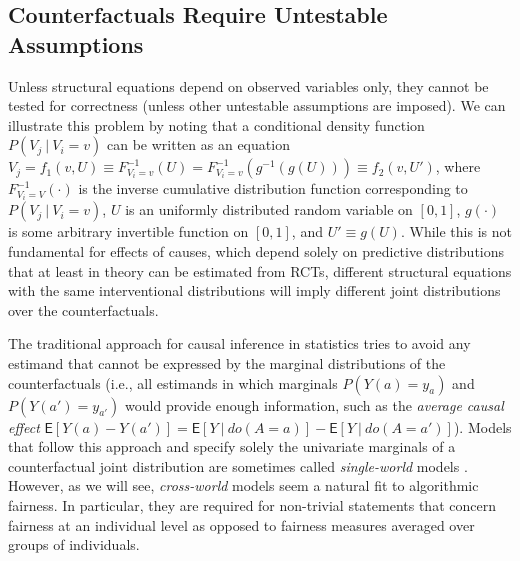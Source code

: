 \documentclass{article}
\begin{document}
\subsection{Counterfactuals Require Untestable Assumptions}
\label{sec:untestable}
Unless structural equations depend on observed variables only, they
cannot be tested for correctness (unless other untestable assumptions
are imposed). We can illustrate this problem by noting that a
conditional density function $P(V_j\ |\ V_i = v)$ can be written as an
equation $V_j = f_1(v, U) \equiv F^{-1}_{V_i = v}(U) = F^{-1}_{V_i = v}(g^{-1}(g(U))) \equiv f_2(v, U')$,
where $F^{-1}_{V_i = V}(\cdot)$ is the inverse cumulative distribution
function corresponding to $P(V_j\ |\ V_i = v)$, $U$ is an uniformly distributed
random variable on $[0, 1]$, $g(\cdot)$ is some
arbitrary invertible function on $[0, 1]$, and $U' \equiv g(U)$. While this is not
fundamental for effects of causes, which depend solely on predictive
distributions 
that at least in
theory can be estimated from RCTs, different structural equations with
the same interventional distributions will imply different joint
distributions over the counterfactuals.

The traditional approach for causal inference in statistics tries to
avoid any estimand that cannot be expressed by the marginal
distributions of the counterfactuals (i.e., all estimands in which
marginals $P(Y(a) = y_a)$ and $P(Y(a') = y_{a'})$ would provide enough information, such as the
\emph{average causal effect} $\mathsf{E}[Y(a) - Y(a')] =
\mathsf{E}[Y\ |\ do(A = a)] - \mathsf{E}[Y\ |\ do(A = a')]$). Models that follow this approach and specify solely the univariate marginals of a counterfactual joint
distribution are sometimes called \emph{single-world} models
\cite{richardson:13}. However, as we will see, \emph{cross-world}
models seem a natural fit to algorithmic fairness. In particular, they
are required for non-trivial statements that concern fairness at an individual
level as opposed to fairness measures averaged over groups of
individuals.
\end{document}

